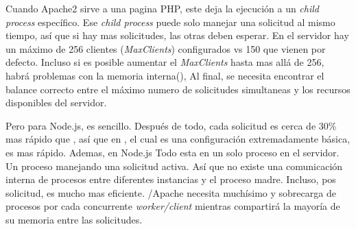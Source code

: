 Cuando Apache2 sirve a una pagina PHP, este deja la ejecución \php a un \textit{child process} específico. Ese \textit{child process} puede solo manejar una solicitud \php al mismo tiempo, así que si hay mas solicitudes, las otras deben esperar. En el servidor hay un máximo de 256 clientes (\textit{MaxClients}) configurados vs 150 que vienen por defecto. Incluso si es posible aumentar el \textit{MaxClients} hasta mas allá de 256, habrá problemas con la memoria interna(), Al final, se necesita encontrar el balance correcto entre el máximo numero de solicitudes simultaneas y los recursos disponibles del servidor.

Pero para Node.js, es sencillo. Después de todo, cada solicitud es cerca de 30\% mas rápido que \php, así que en \performance, el cual es una configuración extremadamente básica, \nodejs es mas rápido. Ademas, en Node.js Todo esta en un solo proceso en el servidor. Un proceso manejando una solicitud activa. Así que no existe una comunicación interna de procesos entre diferentes instancias y el proceso madre. Incluso, pos solicitud, \nodejs es mucho mas eficiente. \php/Apache necesita muchísimo \php y sobrecarga de procesos por cada concurrente \textit{worker/client} mientras \nodejs compartirá la mayoría de su memoria entre las solicitudes.


